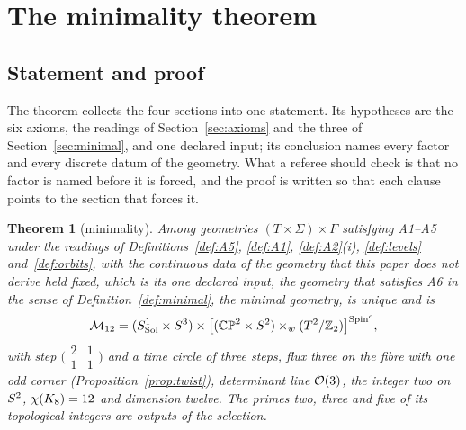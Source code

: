 \documentclass[11pt,a4paper]{article}
\theoremstyle{plain}
\newtheorem{theorem}{Theorem}[section]
\theoremstyle{definition}
\theoremstyle{remark}
\newcommand{\Sol}{\mathrm{Sol}}
\begin{document}
\section{The minimality theorem}\label{sec:theorem}

\subsection{Statement and proof}

The theorem collects the four sections into one statement. Its hypotheses are the six axioms, the readings of Section~\ref{sec:axioms} and the three of Section~\ref{sec:minimal}, and one declared input; its conclusion names every factor and every discrete datum of the geometry. What a referee should check is that no factor is named before it is forced, and the proof is written so that each clause points to the section that forces it.

\begin{theorem}[minimality]\label{thm:main}
Among geometries $(T\times\Sigma)\times F$ satisfying A1--A5 under the readings of Definitions~\ref{def:A5}, \ref{def:A1}, \ref{def:A2}(i), \ref{def:levels} and~\ref{def:orbits}, with the continuous data of the geometry that this paper does not derive held fixed, which is its one declared input, the geometry that satisfies A6 in the sense of Definition~\ref{def:minimal}, the minimal geometry, is unique and is
\[
\Mtwelve=(S^{1}_{\Sol}\times S^{3})\times\bigl[(\CPtwo\times\Stwo)\times_{w}(\Ttwo/\Ztwo)\bigr]^{\Spinc},
\]
with step $\bigl(\begin{smallmatrix}2&1\\1&1\end{smallmatrix}\bigr)$ and a time circle of three steps, flux three on the fibre with one odd corner (Proposition~\ref{prop:twist}), determinant line $\mathcal{O}(3)$,
the integer two on $S^2$,
$\chi(K_8)=12$ and dimension twelve. The primes two, three and five of its topological integers are outputs of the selection.
\end{theorem}
\end{document}
